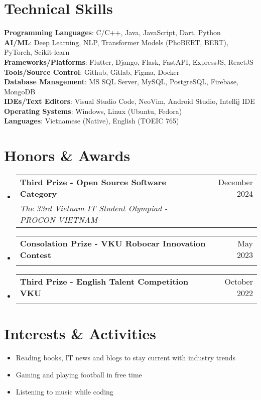 \documentclass[letterpaper,11pt]{article}
\makeatletter
\newcommand{\resumeItem}[1]{
  \item\small{
    {#1 \vspace{-2pt}}
  }
}
\newcommand{\resumeSubheading}[4]{
  \vspace{-2pt}\item
    \begin{tabular*}{0.97\textwidth}[t]{l@{\extracolsep{\fill}}r}
      \textbf{#1} & #2 \\
      \textit{\small#3} & \textit{\small #4} \\
    \end{tabular*}\vspace{-7pt}
}
\newcommand{\resumeSubHeadingListStart}{\begin{itemize}[leftmargin=0.15in, label={}]}
\newcommand{\resumeSubHeadingListEnd}{\end{itemize}}
\newcommand{\resumeItemListStart}{\begin{itemize}}
\newcommand{\resumeItemListEnd}{\end{itemize}\vspace{-5pt}}
\makeatother
\begin{document}
\section{Technical Skills}
 \begin{itemize}[leftmargin=0.15in, label={}]
    \small{\item{
     \textbf{Programming Languages}{: C/C++, Java, JavaScript, Dart, Python} \\
     \textbf{AI/ML}{: Deep Learning, NLP, Transformer Models (PhoBERT, BERT), PyTorch, Scikit-learn} \\
     \textbf{Frameworks/Platforms}{: Flutter, Django, Flask, FastAPI, ExpressJS, ReactJS} \\
     \textbf{Tools/Source Control}{: Github, Gitlab, Figma, Docker} \\
     \textbf{Database Management}{: MS SQL Server, MySQL, PostgreSQL, Firebase, MongoDB} \\
     \textbf{IDEs/Text Editors}{: Visual Studio Code, NeoVim, Android Studio, Intellij IDE} \\
     \textbf{Operating Systems}{: Windows, Linux (Ubuntu, Fedora)} \\
     \textbf{Languages}{: Vietnamese (Native), English (TOEIC 765)}
    }}
 \end{itemize}

\section{Honors \& Awards}
  \resumeSubHeadingListStart
    \resumeSubheading
      {Third Prize - Open Source Software Category}{December 2024}
      {The 33rd Vietnam IT Student Olympiad - PROCON VIETNAM}{}
    \resumeSubheading
      {Consolation Prize - VKU Robocar Innovation Contest}{May 2023}
      {}{}
    \resumeSubheading
      {Third Prize - English Talent Competition VKU}{October 2022}
      {}{}
  \resumeSubHeadingListEnd

\section{Interests \& Activities}
\resumeItemListStart
    \resumeItem{Reading books, IT news and blogs to stay current with industry trends}
    \resumeItem{Gaming and playing football in free time}
    \resumeItem{Listening to music while coding}
\resumeItemListEnd
\end{document}
